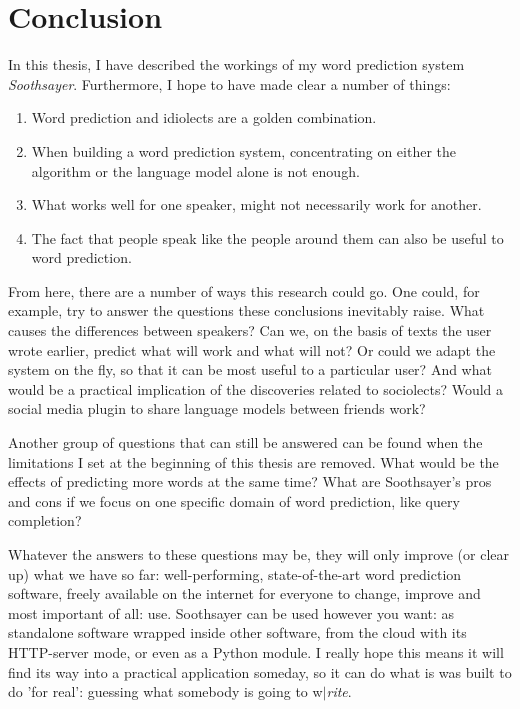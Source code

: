 \documentclass[12pt]{article}
\let\stdsection\section
\renewcommand\section{\newpage\stdsection}
\begin{document}
\section{Conclusion} \label{conclusion}
In this thesis, I have described the workings of my word prediction system \emph{Soothsayer}. Furthermore, I hope to have made clear a number of things:

\begin{enumerate}
\item Word prediction and idiolects are a golden combination.
\item When building a word prediction system, concentrating on either the algorithm or the language model alone is not enough.
\item What works well for one speaker, might not necessarily work for another.
\item The fact that people speak like the people around them can also be useful to word prediction.
\end{enumerate}

From here, there are a number of ways this research could go. One could, for example, try to answer the questions these conclusions inevitably raise. What causes the differences between speakers? Can we, on the basis of texts the user wrote earlier, predict what will work and what will not? Or could we adapt the system on the fly, so that it can be most useful to a particular user? And what would be a practical implication of the discoveries related to sociolects? Would a social media plugin to share language models between friends work? 

Another group of questions that can still be answered can be found when the limitations I set at the beginning of this thesis are removed. What would be the effects of predicting more words at the same time? What are Soothsayer's pros and cons if we focus on one specific domain of word prediction, like query completion?

Whatever the answers to these questions may be, they will only improve (or clear up) what we have so far: well-performing, state-of-the-art word prediction software, freely available on the internet for everyone to change, improve and most important of all: use. Soothsayer can be used however you want: as standalone software wrapped inside other software, from the cloud with its HTTP-server mode, or even as a Python module. I really hope this means it will find its way into a practical application someday, so it can do what is was built to do 'for real': guessing what somebody is going to w$|$\emph{rite}.
\end{document}
